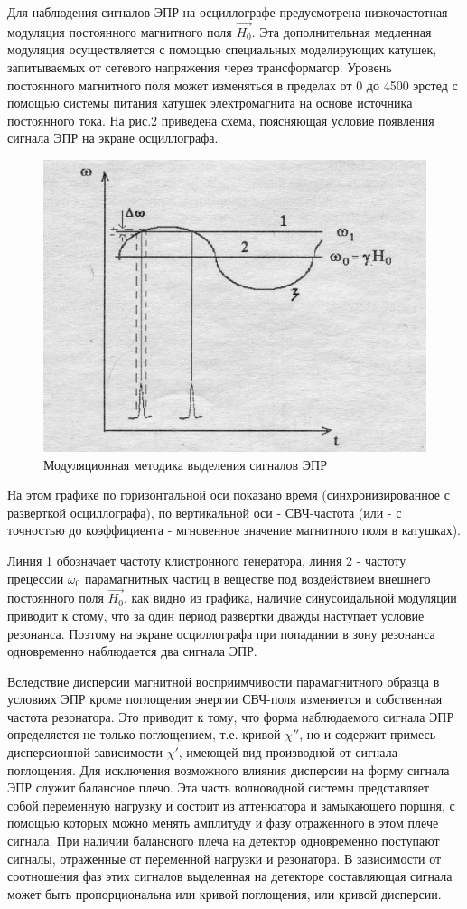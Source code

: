 Для наблюдения сигналов ЭПР на осциллографе предусмотрена низкочастотная модуляция постоянного магнитного поля $\vec{H_0}$. Эта дополнительная медленная модуляция осуществляется с помощью специальных моделирующих катушек, запитываемых от сетевого напряжения через трансформатор. Уровень постоянного магнитного поля может изменяться в пределах от 0 до 4500 эрстед с помощью системы питания катушек электромагнита на основе источника постоянного тока. На рис.2 приведена схема, поясняющая условие появления сигнала ЭПР на экране осциллографа.
\begin{figure}[h!]
	\centering
	\includegraphics[width=0.7\linewidth]{fig/om(t).jpg}
	\caption{Модуляционная методика выделения сигналов ЭПР}
	\label{fig:1}
\end{figure}

 На этом графике по горизонтальной оси показано время (синхронизированное с разверткой осциллографа), по вертикальной оси - СВЧ-частота (или - с точностью до коэффициента - мгновенное значение магнитного поля в катушках). 

 Линия 1 обозначает частоту клистронного генератора, линия 2 - частоту прецессии $\omega_0$ парамагнитных частиц в веществе под воздействием внешнего постоянного поля $\vec{H_0}$. как видно из графика, наличие синусоидальной модуляции приводит к стому, что за один период развертки дважды наступает условие резонанса. Поэтому на экране осциллографа при попадании в зону резонанса одновременно наблюдается два сигнала ЭПР. 

Вследствие дисперсии магнитной восприимчивости парамагнитного образца в условиях ЭПР кроме поглощения энергии СВЧ-поля изменяется и собственная частота резонатора. Это приводит к тому, что форма наблюдаемого сигнала ЭПР определяется не только поглощением, т.е. кривой $\chi''$, но и содержит примесь дисперсионной зависимости $\chi'$, имеющей вид производной от сигнала поглощения. Для исключения возможного влияния дисперсии на форму сигнала ЭПР служит балансное плечо. Эта часть волноводной системы представляет собой переменную нагрузку и состоит из аттенюатора и замыкающего поршня, с помощью которых можно менять амплитуду и фазу отраженного в этом плече сигнала. При наличии балансного плеча на детектор одновременно поступают сигналы, отраженные от переменной нагрузки и резонатора. В зависимости от соотношения фаз этих сигналов выделенная на детекторе составляющая сигнала может быть пропорциональна или кривой поглощения, или кривой дисперсии. 

